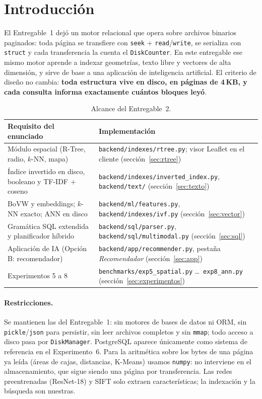 \documentclass[11pt,a4paper]{article}
\newcommand{\code}[1]{\texttt{#1}}
\begin{document}
\section{Introducción}

El Entregable~1 dejó un motor relacional que opera sobre archivos binarios paginados: toda página se
transfiere con \code{seek} + \code{read}/\code{write}, se serializa con \code{struct} y cada
transferencia la cuenta el \code{DiskCounter}. En este entregable ese mismo motor aprende a indexar
geometrías, texto libre y vectores de alta dimensión, y sirve de base a una aplicación de inteligencia
artificial. El criterio de diseño no cambia: \textbf{toda estructura vive en disco, en páginas de
4\,KB, y cada consulta informa exactamente cuántos bloques leyó}.

\begin{table}[H]
\centering\small
\begin{tabularx}{\textwidth}{@{}lX@{}}
\toprule
Requisito del enunciado & Implementación \\
\midrule
Módulo espacial (R-Tree, radio, $k$-NN, mapa) & \code{backend/indexes/rtree.py}; visor Leaflet en el cliente (sección~\ref{sec:rtree}) \\
Índice invertido en disco, booleano y TF-IDF + coseno & \code{backend/indexes/inverted\_index.py}, \code{backend/text/} (sección~\ref{sec:texto}) \\
BoVW y embeddings; $k$-NN exacto; ANN en disco & \code{backend/ml/features.py}, \code{backend/indexes/ivf.py} (sección~\ref{sec:vector}) \\
Gramática SQL extendida y planificador híbrido & \code{backend/sql/parser.py}, \code{backend/sql/multimodal.py} (sección~\ref{sec:sql}) \\
Aplicación de IA (Opción B: recomendador) & \code{backend/app/recommender.py}, pestaña \emph{Recomendador} (sección~\ref{sec:app}) \\
Experimentos 5 a 8 & \code{benchmarks/exp5\_spatial.py} \dots\ \code{exp8\_ann.py} (sección~\ref{sec:experimentos}) \\
\bottomrule
\end{tabularx}
\caption{Alcance del Entregable~2.}
\end{table}

\paragraph{Restricciones.} Se mantienen las del Entregable~1: sin motores de bases de datos ni ORM,
sin \code{pickle}/\code{json} para persistir, sin leer archivos completos y sin \code{mmap}; todo
acceso a disco pasa por \code{DiskManager}. PostgreSQL aparece únicamente como sistema de referencia
en el Experimento~6. Para la aritmética sobre los bytes de una página ya leída (áreas de cajas,
distancias, K-Means) usamos \code{numpy}: no interviene en el almacenamiento, que sigue siendo una
página por transferencia. Las redes preentrenadas (ResNet-18) y SIFT solo extraen características;
la indexación y la búsqueda son nuestras.
\end{document}
